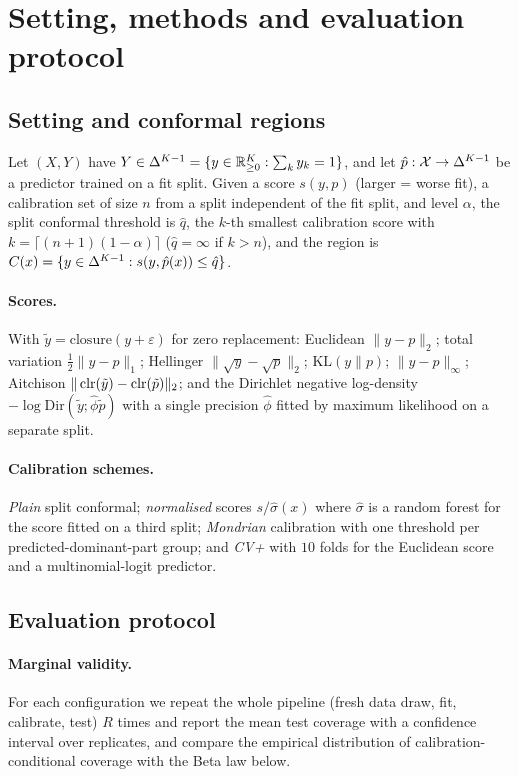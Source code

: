 \section{Setting, methods and evaluation protocol}
\subsection{Setting and conformal regions}
Let $(X,Y)$ have $Y\in\Delta^{K-1}=\{y\in\mathbb{R}^K_{\ge0}:\sum_k y_k=1\}$, and let $\hat p:\mathcal X\to\Delta^{K-1}$ be a predictor trained on a fit split. Given a score $s(y,p)$ (larger = worse fit), a calibration set of size $n$ from a split independent of the fit split, and level $\alpha$, the split conformal threshold is $\hat q$, the $k$-th smallest calibration score with $k=\lceil (n+1)(1-\alpha)\rceil$ ($\hat q=\infty$ if $k>n$), and the region is $C(x)=\{y\in\Delta^{K-1}: s(y,\hat p(x))\le\hat q\}$.

\paragraph{Scores.} With $\tilde y=\mathrm{closure}(y+\varepsilon)$ for zero replacement: Euclidean $\|y-p\|_2$; total variation $\tfrac12\|y-p\|_1$; Hellinger $\|\sqrt y-\sqrt p\|_2$; $\mathrm{KL}(y\|p)$; $\|y-p\|_\infty$; Aitchison $\|\operatorname{clr}(\tilde y)-\operatorname{clr}(\tilde p)\|_2$; and the Dirichlet negative log-density $-\log \mathrm{Dir}(\tilde y;\hat\phi \tilde p)$ with a single precision $\hat\phi$ fitted by maximum likelihood on a separate split.

\paragraph{Calibration schemes.} \emph{Plain} split conformal; \emph{normalised} scores $s/\hat\sigma(x)$ where $\hat\sigma$ is a random forest for the score fitted on a third split; \emph{Mondrian} calibration with one threshold per predicted-dominant-part group; and \emph{CV+} with $10$ folds for the Euclidean score and a multinomial-logit predictor.

\subsection{Evaluation protocol}\label{sec:protocol}
\paragraph{Marginal validity.} For each configuration we repeat the whole pipeline (fresh data draw, fit, calibrate, test) $R$ times and report the mean test coverage with a confidence interval over replicates, and compare the empirical distribution of calibration-conditional coverage with the Beta law below.
